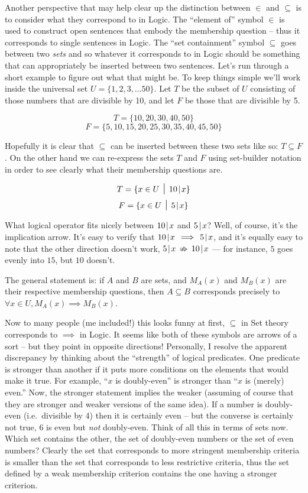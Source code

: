 \newpage

Another perspective that may help clear up the distinction between
$\in$ and $\subseteq$ is to consider what they correspond to in Logic.
The ``element of'' symbol $\in$ is used to construct open sentences
that embody the membership question -- thus it corresponds to single
sentences in Logic.  The ``set containment'' symbol $\subseteq$ goes
between two \emph{sets} and so whatever it corresponds to in Logic
should be something that can appropriately be inserted between two
sentences.  Let's run through a short example to figure out what that
might be.   To keep things
simple we'll work inside the universal set $U=\{ 1, 2, 3, \ldots 50 \}$.
Let $T$ be the subset of $U$ consisting of those numbers that are 
divisible by 10, and let $F$ be those that are divisible by 5.

\[ T = \{10, 20, 30, 40, 50 \} \]
\[ F = \{5, 10, 15, 20, 25, 30, 35, 40, 45, 50 \} \]

Hopefully it is clear that $\subseteq$ can be inserted between these two sets
like so: $T \subseteq F$.  
On the other hand we can re-express the sets $T$ and $F$ using set-builder
notation in order to see clearly what their membership questions are.

\[ T = \{ x \in U \; \suchthat \; 10\divides x \} \]
\[ F = \{ x \in U \; \suchthat \; 5\divides x \} \]

What logical operator fits nicely between $10\!\mid\! x$ and $5\!\mid\! x$?
Well, of course, it's the implication arrow.  It's easy to
verify that $10\!\mid\! x \, \implies \, 5\!\mid\! x$, and it's equally easy
to note that the other direction doesn't work, $5\!\mid\! x \, \nRightarrow \, 10\!\mid\! x$ --- for instance, $5$ goes evenly into $15$, but $10$ doesn't.
 
The general statement is: if $A$ and $B$ are sets, and $M_A(x)$ and $M_B(x)$ 
are their respective membership questions, then $A \subseteq B$ corresponds
precisely to $\forall x \in U, M_A(x) \implies M_B(x)$.

    
Now to many people (me included!) this looks funny at first, $\subseteq$
in Set theory corresponds to $\implies$ in Logic.  It seems like both
of these symbols are arrows of a sort -- but they point in opposite
directions!  Personally, I resolve the apparent discrepancy by thinking
about the ``strength'' of logical predicates.  One predicate is stronger
than another if it puts more conditions on the elements that would make
it true.  For example, ``$x$ is doubly-even'' is stronger than 
``$x$ is (merely) even.''   Now, the stronger statement implies the weaker
(assuming of course that they are stronger and weaker versions of the 
same idea).  If a number is doubly-even (i.e.\ divisible by 4) then it
is certainly even -- but the converse is certainly not true, $6$ is even
but \emph{not} doubly-even.  Think of all this in terms of sets now.
Which set contains the other, the set of doubly-even numbers or the set
of even numbers?   Clearly the set that corresponds to more stringent
membership criteria is smaller than the set that corresponds
to less restrictive criteria, thus the set defined by a weak membership
criterion contains the one having a stronger criterion.  


